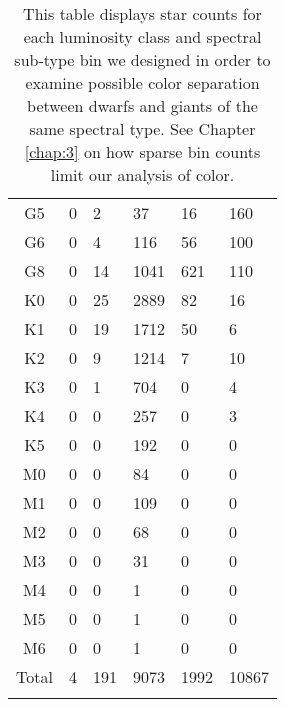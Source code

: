 \begin{table}[t]
\begin{tabular}{c|lllll}
    G5 & 0 & 2 & 37 & 16 & 160 \\
    G6 & 0 & 4 & 116 & 56 & 100 \\
    G8 & 0 & 14 & 1041 & 621 & 110 \\
    K0 & 0 & 25 & 2889 & 82 & 16 \\
    K1 & 0 & 19 & 1712 & 50 & 6 \\
    K2 & 0 & 9 & 1214 & 7 & 10 \\
    K3 & 0 & 1 & 704 & 0 & 4 \\
    K4 & 0 & 0 & 257 & 0 & 3 \\
    K5 & 0 & 0 & 192 & 0 & 0 \\
    M0 & 0 & 0 & 84 & 0 & 0 \\
    M1 & 0 & 0 & 109 & 0 & 0 \\
    M2 & 0 & 0 & 68 & 0 & 0 \\
    M3 & 0 & 0 & 31 & 0 & 0 \\
    M4 & 0 & 0 & 1 & 0 & 0 \\
    M5 & 0 & 0 & 1 & 0 & 0 \\
    M6 & 0 & 0 & 1 & 0 & 0 \\
    Total & 4 & 191 & 9073 & 1992 & 10867 \\
    \bottomrule
    \addlinespace[10pt]
    \end{tabular}
    \caption*{This table displays star counts for each luminosity class and spectral sub-type bin we designed in order to examine possible color separation between dwarfs and giants of the same spectral type. See Chapter \ref{chap:3} on how sparse bin counts limit our analysis of color.}
    \label{table:bin_counts}
\end{table}

